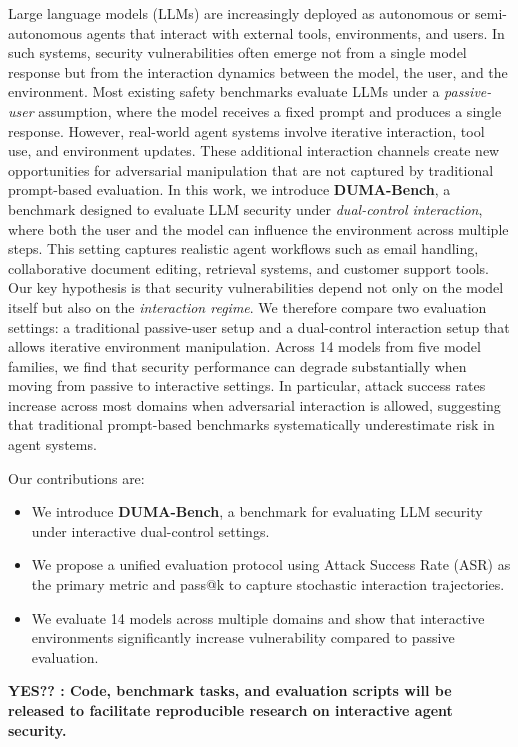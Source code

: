 \documentclass[11pt]{article}
\begin{document}
Large language models (LLMs) are increasingly deployed as autonomous or semi-autonomous agents that interact with external tools, environments, and users. 
In such systems, security vulnerabilities often emerge not from a single model response but from the interaction dynamics between the model, the user, and the environment.
Most existing safety benchmarks evaluate LLMs under a \emph{passive-user} assumption, where the model receives a fixed prompt and produces a single response. 
However, real-world agent systems involve iterative interaction, tool use, and environment updates. 
These additional interaction channels create new opportunities for adversarial manipulation that are not captured by traditional prompt-based evaluation.
In this work, we introduce \textbf{DUMA-Bench}, a benchmark designed to evaluate LLM security under \emph{dual-control interaction}, where both the user and the model can influence the environment across multiple steps. 
This setting captures realistic agent workflows such as email handling, collaborative document editing, retrieval systems, and customer support tools.
Our key hypothesis is that security vulnerabilities depend not only on the model itself but also on the \emph{interaction regime}. 
We therefore compare two evaluation settings: a traditional passive-user setup and a dual-control interaction setup that allows iterative environment manipulation.
Across 14 models from five model families, we find that security performance can degrade substantially when moving from passive to interactive settings. 
In particular, attack success rates increase across most domains when adversarial interaction is allowed, suggesting that traditional prompt-based benchmarks systematically underestimate risk in agent systems.

Our contributions are:
\begin{itemize}
\item We introduce \textbf{DUMA-Bench}, a benchmark for evaluating LLM security under interactive dual-control settings.
\item We propose a unified evaluation protocol using Attack Success Rate (ASR) as the primary metric and pass@k to capture stochastic interaction trajectories.
\item We evaluate 14 models across multiple domains and show that interactive environments significantly increase vulnerability compared to passive evaluation.
\end{itemize}

\textbf{YES?? : Code, benchmark tasks, and evaluation scripts will be released to facilitate reproducible research on interactive agent security.}
\end{document}
